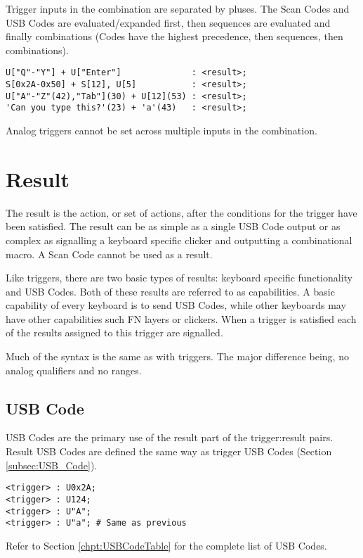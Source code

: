 \documentclass{kiibohd-template}
\begin{document}
Trigger inputs in the combination are separated by pluses.
The Scan Codes and USB Codes are evaluated/expanded first, then sequences are evaluated and finally combinations (Codes have the highest precedence, then sequences, then combinations).

\begin{lstlisting}
U["Q"-"Y"] + U["Enter"]              : <result>;
S[0x2A-0x50] + S[12], U[5]           : <result>;
U["A"-"Z"(42),"Tab"](30) + U[12](53) : <result>;
'Can you type this?'(23) + 'a'(43)   : <result>;
\end{lstlisting}

Analog triggers cannot be set across multiple inputs in the combination.


\section{Result}

The result is the action, or set of actions, after the conditions for the trigger have been satisfied.
The result can be as simple as a single USB Code output or as complex as signalling a keyboard specific clicker and outputting a combinational macro.
A Scan Code cannot be used as a result.

Like triggers, there are two basic types of results: keyboard specific functionality and USB Codes.
Both of these results are referred to as capabilities.
A basic capability of every keyboard is to send USB Codes, while other keyboards may have other capabilities such FN layers or clickers.
When a trigger is satisfied each of the results assigned to this trigger are signalled.

Much of the syntax is the same as with triggers.
The major difference being, no analog qualifiers and no ranges.


\subsection{USB Code}

USB Codes are the primary use of the result part of the trigger:result pairs.
Result USB Codes are defined the same way as trigger USB Codes (Section \ref{subsec:USB_Code}).

\begin{lstlisting}
<trigger> : U0x2A;
<trigger> : U124;
<trigger> : U"A";
<trigger> : U"a"; # Same as previous
\end{lstlisting}

Refer to Section \ref{chpt:USBCodeTable} for the complete list of USB Codes.
\end{document}
